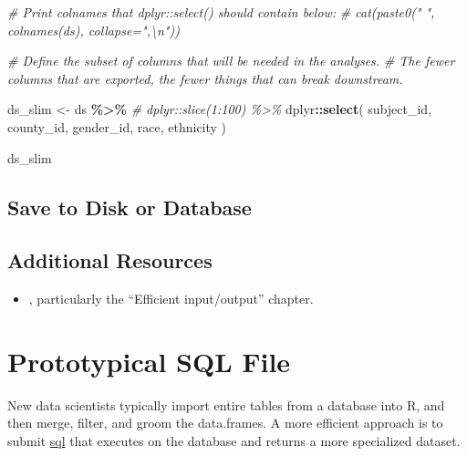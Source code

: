 \documentclass[
]{book}
\newenvironment{Shaded}{\begin{snugshade}}{\end{snugshade}}
\newcommand{\CommentTok}[1]{\textcolor[rgb]{0.56,0.35,0.01}{\textit{#1}}}
\newcommand{\KeywordTok}[1]{\textcolor[rgb]{0.13,0.29,0.53}{\textbf{#1}}}
\newcommand{\NormalTok}[1]{#1}
\newcommand{\OperatorTok}[1]{\textcolor[rgb]{0.81,0.36,0.00}{\textbf{#1}}}
\newcommand{\StringTok}[1]{\textcolor[rgb]{0.31,0.60,0.02}{#1}}
\providecommand{\tightlist}{%
  \setlength{\itemsep}{0pt}\setlength{\parskip}{0pt}}
\begin{document}
\begin{Shaded}
\begin{Highlighting}[]
\CommentTok{\# Print colnames that \textasciigrave{}dplyr::select()\textasciigrave{}  should contain below:}
\CommentTok{\#   cat(paste0("    ", colnames(ds), collapse=",\textbackslash{}n"))}

\CommentTok{\# Define the subset of columns that will be needed in the analyses.}
\CommentTok{\#   The fewer columns that are exported, the fewer things that can break downstream.}

\NormalTok{ds\_slim \textless{}{-}}
\StringTok{  }\NormalTok{ds }\OperatorTok{\%\textgreater{}\%}
\StringTok{  }\CommentTok{\# dplyr::slice(1:100) \%\textgreater{}\%}
\StringTok{  }\NormalTok{dplyr}\OperatorTok{::}\KeywordTok{select}\NormalTok{(}
\NormalTok{    subject\_id,}
\NormalTok{    county\_id,}
\NormalTok{    gender\_id,}
\NormalTok{    race,}
\NormalTok{    ethnicity}
\NormalTok{  )}

\NormalTok{ds\_slim}
\end{Highlighting}
\end{Shaded}

\hypertarget{save-to-disk-or-database}{%
\section{Save to Disk or Database}\label{save-to-disk-or-database}}

\hypertarget{additional-resources}{%
\section{Additional Resources}\label{additional-resources}}

\begin{itemize}
\tightlist
\item
  \citep{gillespie}, particularly the ``Efficient input/output'' chapter.
\end{itemize}

\hypertarget{file-prototype-sql}{%
\chapter{Prototypical SQL File}\label{file-prototype-sql}}

New data scientists typically import entire tables from a database into R, and then merge, filter, and groom the data.frames. A more efficient approach is to submit \href{https://en.wikipedia.org/wiki/SQL}{sql} that executes on the database and returns a more specialized dataset.
\end{document}
